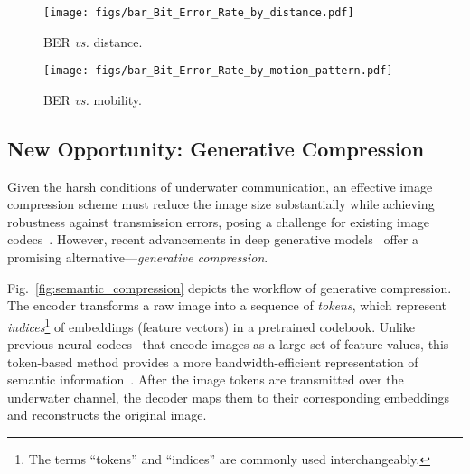 \begin{figure}[t]
    \centering
    \begin{minipage}{0.23\textwidth}
        \centering
        \texttt{[image: figs/bar\_Bit\_Error\_Rate\_by\_distance.pdf]}
        \caption{BER {\em vs.} distance.}
        \label{fig:limitation_ofdm_distance}
    \end{minipage}\hfill
    \begin{minipage}{0.23\textwidth}
        \centering
        \texttt{[image: figs/bar\_Bit\_Error\_Rate\_by\_motion\_pattern.pdf]}
        \caption{BER {\em vs.} mobility.}
        \label{fig:limitation_ofdm_mobility}
    \end{minipage}
\end{figure}




















\subsection{New Opportunity: Generative Compression}\label{sec:generative_compression}

Given the harsh conditions of underwater communication, an effective image
compression scheme must reduce the image size substantially while achieving
robustness against transmission errors, posing a challenge for existing image
codecs~\cite{wallace1991jpeg,webp2024,cheng2020image}. However, recent
advancements in deep generative
models~\cite{NIPS2014_5ca3e9b1,yu2024image,mao2024extreme} offer a promising
alternative---\textit{generative compression}.


Fig.~\ref{fig:semantic_compression} depicts the workflow of generative compression.
The encoder transforms a raw image into a sequence of \emph{tokens},
which represent \emph{indices}\footnote{The terms ``tokens'' and ``indices'' are
commonly used interchangeably.} of embeddings (\ie feature vectors)
in a pretrained codebook.
Unlike previous neural codecs~\cite{cheng2020image} that encode images
as a large set of feature values, this token-based method provides
a more bandwidth-efficient representation of semantic information~\cite{yu2024image,mao2024extreme}.
After the image tokens are transmitted over the underwater channel,
the decoder maps them to their corresponding embeddings and
reconstructs the original image.

